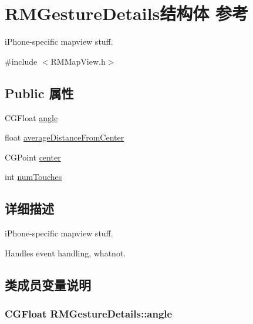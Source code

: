 \hypertarget{struct_r_m_gesture_details}{\section{R\-M\-Gesture\-Details结构体 参考}
\label{struct_r_m_gesture_details}
}


i\-Phone-\/specific mapview stuff.  




{\ttfamily \#include $<$R\-M\-Map\-View.\-h$>$}

\subsection*{Public 属性}
\begin{DoxyCompactItemize}
\item 
C\-G\-Float \hyperlink{struct_r_m_gesture_details_a3aa57885fd0bd854a00dce0844db1438}{angle}
\item 
float \hyperlink{struct_r_m_gesture_details_a2c074c58329f5a730c2cbe5f99c28e24}{average\-Distance\-From\-Center}
\item 
C\-G\-Point \hyperlink{struct_r_m_gesture_details_ab46d774b19e402ea75f1f4af23fe53ca}{center}
\item 
int \hyperlink{struct_r_m_gesture_details_a7efc4ebc12eed19c8155c2aea2131cf9}{num\-Touches}
\end{DoxyCompactItemize}


\subsection{详细描述}
i\-Phone-\/specific mapview stuff. 

Handles event handling, whatnot. 

\subsection{类成员变量说明}
\hypertarget{struct_r_m_gesture_details_a3aa57885fd0bd854a00dce0844db1438}{
\subsubsection[{angle}]{\setlength{\rightskip}{0pt plus 5cm}C\-G\-Float R\-M\-Gesture\-Details\-::angle}}\label{struct_r_m_gesture_details_a3aa57885fd0bd854a00dce0844db1438}


